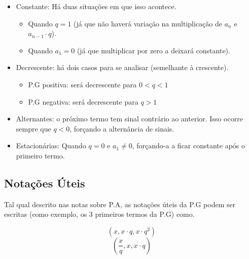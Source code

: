 \documentclass[11pt]{article}
\begin{document}
\begin{tcolorbox}[colback=LightYellow]
\begin{itemize}
\item Constante: Há duas situações em que isso acontece.
      \begin{itemize}
              \item Quando $q = 1$ (já que não haverá variação na multiplicação de $a_{n}$ e $a_{n - 1}\cdot q$).
              \item Quando $a_{1} = 0$ (já que multiplicar por zero a deixará constante).
      \end{itemize}
\end{itemize}
\end{tcolorbox}

\begin{tcolorbox}[colback=LightYellow]
\begin{itemize}
\item Decrescente: há dois casos para se analisar (semelhante à crescente).
      \begin{itemize}
              \item P.G positiva: será decrescente para $0 < q < 1$
              \item P.G negativa: será decrescente para $q > 1$
      \end{itemize}
\end{itemize}
\end{tcolorbox}

\begin{tcolorbox}[colback=LightYellow]
\begin{itemize}
\item Alternantes: o próximo termo tem sinal contrário ao anterior. Isso ocorre sempre que $q < 0$, forçando a alternância de sinais.

\item Estacionárias: Quando $q = 0$ e $a_{1} \neq 0$, forçando-a a ficar constante após o primeiro termo.
\end{itemize}
\end{tcolorbox}

\subsection{Notações Úteis}

Tal qual descrito nas notas sobre P.A, as notações úteis da P.G podem ser escritas (como exemplo, os 3 primeiros termos da P.G) como.

\[\left(x, x\cdot q, x\cdot q^{2}\right)\]
\[\left(\frac{x}{q}, x, x\cdot q\right)\]
\end{document}
